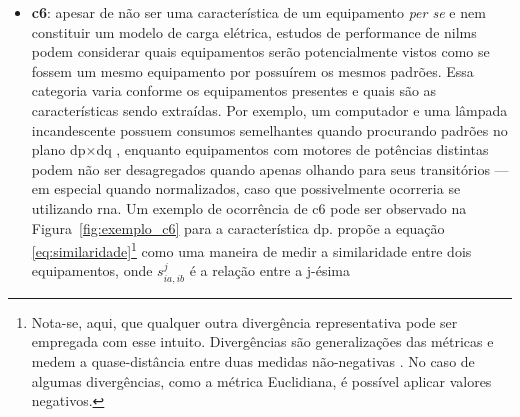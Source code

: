 \begin{itemize}
--- esse quando com o compressor ligado --- apresentam uma dinâmica
com oscilações em frequências sub-harmônicas, os mesmos são potenciais
dificultadores à identificação de rastros deixados por outros
equipamentos, particularmente os de menor consumo, caso estudado em
\cite{nilm_liang_pt2_2010_40}. A Figura~\ref{fig:ar_cond_dinamica}
demonstra a dinâmica sub-harmônica causada na envoltória para esse
equipamento. Outros exemplos de equipamentos com motores que também geram
oscilações --- mas em ordem inferior ao ar condicionado --- são:
microondas, geladeira, desumidificador
\cite{nilm_liang_pt2_2010_40};
\begin{figure}[h!t]
\centering
\texttt{[image: imagens/ArCondicionado-CargaDemandaDinamica\_ComTextoImpr.pdf]}
\caption[\acf{c5}: ar condicionado]
{Exemplo de \acf{c5}: ar condicionado. Também é possível
observar uma alteração gradual no nível de consumo, que dificultará
o processo de reconstrução de energia.}
\label{fig:ar_cond_dinamica}
\end{figure}
\item \textbf{\Gls{c6}}: apesar de não ser
uma característica de um equipamento \emph{per se} e nem constituir um
modelo de carga elétrica, estudos de performance de \glspl{nilm} podem
considerar quais equipamentos serão potencialmente vistos como se
fossem um mesmo equipamento por possuírem os mesmos padrões. Essa categoria
varia conforme os equipamentos presentes e quais são as
características sendo extraídas. Por exemplo, um computador e uma
lâmpada incandescente possuem consumos semelhantes quando procurando
padrões no plano \acs{dp}$\times$\acs{dq}
\cite{nilm_laughman_continuous_variables_2003_9}, enquanto
equipamentos com motores de potências distintas podem não ser
desagregados quando apenas olhando para seus transitórios --- em
especial quando normalizados, caso que possivelmente ocorreria se
utilizando \acrfull{rna}. Um exemplo de ocorrência de \acs{c6} pode
ser observado na Figura~\ref{fig:exemplo_c6} para a característica
\acs{dp}. \cite{nilm_liang_pt1_2010_34} propõe a
equação \ref{eq:similaridade}\footnote{Nota-se, aqui, que qualquer
outra divergência representativa pode ser empregada com esse
intuito. Divergências são generalizações das métricas e medem a
quase-distância entre duas medidas não-negativas
\cite[cap. 2]{cichocki2009nonnegative}. No caso de algumas
divergências, como a métrica Euclidiana, é possível aplicar valores
negativos.} como uma maneira de medir a similaridade entre dois
equipamentos, onde $s^j_{ia,ib}$ é a relação entre a j-ésima

\end{itemize}
